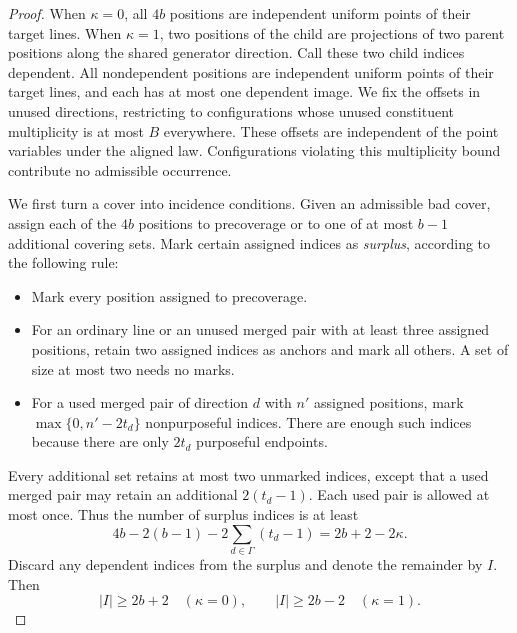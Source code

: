 \begin{proof}
When $\kappa=0$, all $4b$ positions are independent uniform points of
their target lines.  When $\kappa=1$, two positions of the child are
projections of two parent positions along the shared generator direction.
Call these two child indices dependent.  All nondependent positions are
independent uniform points of their target lines, and each has at most
one dependent image.  We fix the offsets in unused directions, restricting
to configurations whose unused constituent multiplicity is at most $B$
everywhere.  These offsets are independent of the point variables under
the aligned law.  Configurations violating this multiplicity bound
contribute no admissible occurrence.

We first turn a cover into incidence conditions.  Given an admissible
bad cover, assign each of the $4b$ positions to precoverage or to one of
at most $b-1$ additional covering sets.  Mark certain assigned indices as
\emph{surplus}, according to the following rule:
\begin{itemize}
\item Mark every position assigned to precoverage.
\item For an ordinary line or an unused merged pair with at least three
assigned positions, retain two assigned indices as anchors and mark all
others.  A set of size at most two needs no marks.
\item For a used merged pair of direction $d$ with $n'$ assigned
positions, mark $\max\{0,n'-2t_d\}$ nonpurposeful indices.  There are
enough such indices because there are only $2t_d$ purposeful endpoints.
\end{itemize}
Every additional set retains at most two unmarked indices, except that a
used merged pair may retain an additional $2(t_d-1)$.  Each used pair is
allowed at most once.  Thus the number of surplus indices is at least
\[
 4b-2(b-1)-2\sum_{d\in\Gamma}(t_d-1)
       =2b+2-2\kappa.
\]
Discard any dependent indices from the surplus and denote the remainder
by $I$.  Then
\begin{equation}\label{eq:pencil-surplus}
 |I|\ge 2b+2\quad(\kappa=0),\qquad
 |I|\ge 2b-2\quad(\kappa=1).
\end{equation}


\end{proof}

